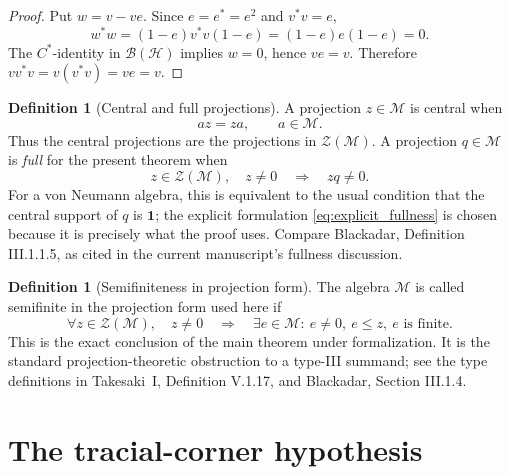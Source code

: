 \documentclass[11pt,reqno]{amsart}
\numberwithin{equation}{section}
\theoremstyle{definition}
\newtheorem{definition}[theorem]{Definition}
\theoremstyle{remark}
\newcommand{\cB}{\mathcal B}
\newcommand{\cH}{\mathcal H}
\newcommand{\cM}{\mathcal M}
\newcommand{\cZ}{\mathcal Z}
\newcommand{\id}{\mathbf 1}
\begin{document}
\begin{proof}
Put $w=v-ve$.  Since $e=e^*=e^2$ and $v^*v=e$,
\begin{equation}
  w^*w=(1-e)v^*v(1-e)=(1-e)e(1-e)=0.
  \label{eq:partial_isometry_zero_norm}
\end{equation}
The $C^*$-identity in $\cB(\cH)$ implies $w=0$, hence $ve=v$.  Therefore
$vv^*v=v(v^*v)=ve=v$.
\end{proof}

\begin{definition}[Central and full projections]
\label{def:central_full}
A projection $z\in\cM$ is central when
\begin{equation}
  az=za,
  \qquad
  a\in\cM.
  \label{eq:central_projection}
\end{equation}
Thus the central projections are the projections in $\cZ(\cM)$.
A projection $q\in\cM$ is \emph{full} for the present theorem when
\begin{equation}
  z\in\cZ(\cM),\quad z\neq0
  \quad\Longrightarrow\quad
  zq\neq0.
  \label{eq:explicit_fullness}
\end{equation}
For a von Neumann algebra, this is equivalent to the usual condition that the
central support of $q$ is $\id$; the explicit formulation
\eqref{eq:explicit_fullness} is chosen because it is precisely what the proof
uses.  Compare Blackadar, Definition III.1.1.5, as cited in the current
manuscript's fullness discussion.
\end{definition}

\begin{definition}[Semifiniteness in projection form]
\label{def:semifinite_projection_form}
The algebra $\cM$ is called semifinite in the projection form used here if
\begin{equation}
  \forall z\in\cZ(\cM),\quad z\neq0
  \quad\Longrightarrow\quad
  \exists e\in\cM:
  \ e\neq0,\ e\leq z,\ e\text{ is finite}.
  \label{eq:semifinite_projection_form}
\end{equation}
This is the exact conclusion of the main theorem under formalization.  It is
the standard projection-theoretic obstruction to a type-III summand; see the
type definitions in Takesaki~I, Definition V.1.17, and Blackadar,
Section III.1.4.
\end{definition}

\section{The tracial-corner hypothesis}
\label{sec:tracial_corner}
\end{document}
